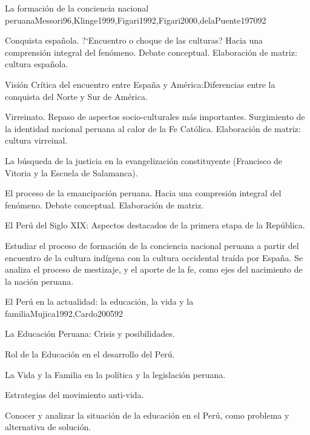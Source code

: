 \begin{syllabus}
\begin{unit}{La formación de la conciencia nacional peruana}{Messori96,Klinge1999,Figari1992,Figari2000,delaPuente1970}{9}{2}
\begin{topics}
      \item Conquista española. ?`Encuentro o choque de las culturas? Hacia una comprensión integral del fenómeno. Debate conceptual. Elaboración de matriz: cultura española.
      \item Visión Crítica del encuentro entre España y América:Diferencias entre la conquista del Norte y Sur de América.
      \item Virreinato. Repaso de aspectos socio-culturales más importantes. Surgimiento de la identidad nacional peruana al calor de la Fe Católica. Elaboración de matriz: cultura virreinal.
      \item La búsqueda de la justicia en la evangelización constituyente (Francisco de Vitoria y la Escuela de Salamanca).
      \item El proceso de la emancipación peruana. Hacia una compresión integral del fenómeno. Debate conceptual. Elaboración de matriz.
      \item El Perú del Siglo XIX: Aspectos destacados de la primera etapa de la República.
\end{topics}
\begin{unitgoals}
      \item Estudiar el proceso de formación de la conciencia nacional peruana a partir del encuentro de la cultura indígena con la cultura occidental traída por España. Se analiza el proceso de mestizaje, y el aporte de la fe, como ejes del nacimiento de la nación peruana.
\end{unitgoals}
\end{unit}

\begin{unit}{El Perú en la actualidad: la educación, la vida y la familia}{Mujica1992,Cardo2005}{9}{2}
\begin{topics}
      \item La Educación Peruana: Crisis y posibilidades.
      \item Rol de la Educación en el desarrollo del Perú.
      \item La Vida y la Familia en la política y la legislación peruana.
      \item Estrategias del movimiento anti-vida.
\end{topics}
\begin{unitgoals}
      \item Conocer y analizar la situación de la educación en el Perú, como problema y alternativa de solución.
\end{unitgoals}
\end{unit}


\end{syllabus}
